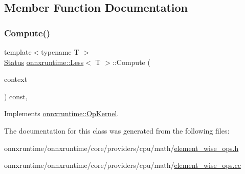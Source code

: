 \subsection{Member Function Documentation}
\mbox{\label{classonnxruntime_1_1Less_a1ff5214fb355f516196bc5aa84af65ad}} 
\subsubsection{\texorpdfstring{Compute()}{Compute()}}
{\footnotesize\ttfamily template$<$typename T $>$ \\
\mbox{\hyperlink{classonnxruntime_1_1common_1_1Status}{Status}} \mbox{\hyperlink{classonnxruntime_1_1Less}{onnxruntime\+::\+Less}}$<$ T $>$\+::Compute (\begin{DoxyParamCaption}\item[{\mbox{\hyperlink{classonnxruntime_1_1OpKernelContext}{Op\+Kernel\+Context}} $\ast$}]{context }\end{DoxyParamCaption}) const\hspace{0.3cm}{\ttfamily [override]}, {\ttfamily [virtual]}}



Implements \mbox{\hyperlink{classonnxruntime_1_1OpKernel_a9eca8656a78b1b3ab9d3351a12798650}{onnxruntime\+::\+Op\+Kernel}}.



The documentation for this class was generated from the following files\+:\begin{DoxyCompactItemize}
\item 
onnxruntime/onnxruntime/core/providers/cpu/math/\mbox{\hyperlink{element__wise__ops_8h}{element\+\_\+wise\+\_\+ops.\+h}}\item 
onnxruntime/onnxruntime/core/providers/cpu/math/\mbox{\hyperlink{element__wise__ops_8cc}{element\+\_\+wise\+\_\+ops.\+cc}}\end{DoxyCompactItemize}

